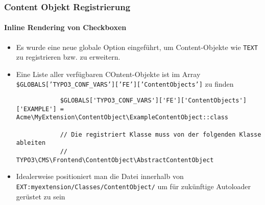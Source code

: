 
\begin{frame}[fragile]
	\frametitle{Content Objekt Registrierung}
	\framesubtitle{Inline Rendering von Checkboxen}

	\begin{itemize}
		\item Es wurde eine neue globale Option eingeführt, um Content-Objekte wie \texttt{TEXT} zu registrieren bzw. zu erweitern. 
		\item Eine Liste aller verfügbaren COntent-Objekte ist im Array \texttt{\$GLOBALS['TYPO3\_CONF\_VARS']['FE']['ContentObjects']} zu finden
		\begin{lstlisting}
			$GLOBALS['TYPO3_CONF_VARS']['FE']['ContentObjects']['EXAMPLE'] = Acme\MyExtension\ContentObject\ExampleContentObject::class

			// Die registriert Klasse muss von der folgenden Klasse ableiten
			// TYPO3\CMS\Frontend\ContentObject\AbstractContentObject

		\end{lstlisting}
		\item Idealerweise positioniert man die Datei innerhalb von \texttt{EXT:myextension/Classes/ContentObject/} um für zukünftige Autoloader gerüstet zu sein
	\end{itemize}

\end{frame}


